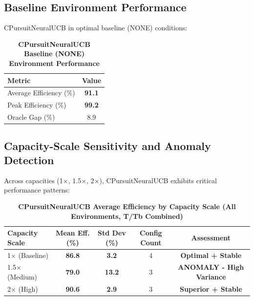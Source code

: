 \documentclass[12pt,a4paper]{article}
\newcommand{\performance}[1]{\textcolor{performancecolor}{\textbf{#1}}}
\newcommand{\critical}[1]{\textcolor{criticalcolor}{\textbf{#1}}}
\newcommand{\success}[1]{\textcolor{successcolor}{\textbf{#1}}}
\begin{document}
\subsection{Baseline Environment Performance}

CPursuitNeuralUCB in optimal baseline (NONE) conditions:

\begin{table}[H]
\centering
\caption{\performance{CPursuitNeuralUCB Baseline (NONE) Environment Performance}}
\begin{tabular}{|l|c|}
\hline
\textbf{Metric} & \textbf{Value} \\
\hline
Average Efficiency (\%) & \performance{\textbf{91.1}} \\
Peak Efficiency (\%) & \performance{\textbf{99.2}} \\
Oracle Gap (\%) & 8.9 \\
\hline
\end{tabular}
\end{table}

\subsection{Capacity-Scale Sensitivity and Anomaly Detection}

Across capacities (1$\times$, 1.5$\times$, 2$\times$), CPursuitNeuralUCB exhibits critical performance patterns:

\begin{table}[H]
\centering
\caption{\performance{CPursuitNeuralUCB Average Efficiency by Capacity Scale (All Environments, T/Tb Combined)}}
\begin{tabular}{|l|c|c|c|c|}
\hline
\textbf{Capacity Scale} & \textbf{Mean Eff. (\%)} & \textbf{Std Dev (\%)} & \textbf{Config Count} & \textbf{Assessment} \\
\hline
\hline
1$\times$ (Baseline) & \performance{86.8} & \performance{3.2} & 4 & \success{Optimal + Stable} \\
1.5$\times$ (Medium) & \critical{79.0} & \critical{13.2} & 3 & \critical{ANOMALY - High Variance} \\
2$\times$ (High) & \performance{90.6} & \performance{2.9} & 3 & \success{Superior + Stable} \\
\hline
\end{tabular}
\end{table}
\end{document}
